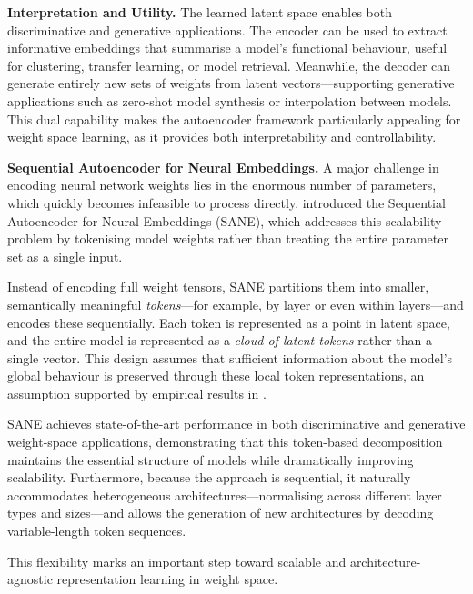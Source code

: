 \vspace{0.5em}
\noindent
\textbf{Interpretation and Utility.}
The learned latent space enables both discriminative and generative applications. The encoder can be used to extract informative embeddings that summarise a model’s functional behaviour, useful for clustering, transfer learning, or model retrieval. Meanwhile, the decoder can generate entirely new sets of weights from latent vectors—supporting generative applications such as zero-shot model synthesis or interpolation between models. This dual capability makes the autoencoder framework particularly appealing for weight space learning, as it provides both interpretability and controllability.

\vspace{1em}
\noindent
\textbf{Sequential Autoencoder for Neural Embeddings.}
A major challenge in encoding neural network weights lies in the enormous number of parameters, which quickly becomes infeasible to process directly. \cite{pmlr-v235-schurholt24a} introduced the Sequential Autoencoder for Neural Embeddings (SANE), which addresses this scalability problem by tokenising model weights rather than treating the entire parameter set as a single input.  

Instead of encoding full weight tensors, SANE partitions them into smaller, semantically meaningful \textit{tokens}—for example, by layer or even within layers—and encodes these sequentially. Each token is represented as a point in latent space, and the entire model is represented as a \textit{cloud of latent tokens} rather than a single vector. This design assumes that sufficient information about the model’s global behaviour is preserved through these local token representations, an assumption supported by empirical results in \cite{pmlr-v235-schurholt24a}.

SANE achieves state-of-the-art performance in both discriminative and generative weight-space applications, demonstrating that this token-based decomposition maintains the essential structure of models while dramatically improving scalability. Furthermore, because the approach is sequential, it naturally accommodates heterogeneous architectures—normalising across different layer types and sizes—and allows the generation of new architectures by decoding variable-length token sequences.  

This flexibility marks an important step toward scalable and architecture-agnostic representation learning in weight space.

